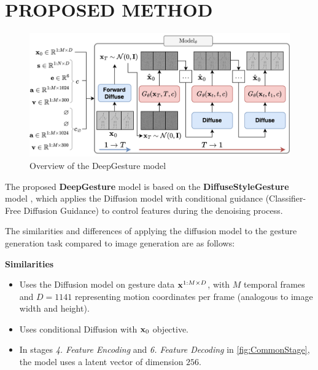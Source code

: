 \section{PROPOSED METHOD}
\label{sec:system_overview}

\begin{figure}[h]
	\centering
	\includegraphics[width=\linewidth]{figures/AllStage}
	\caption{Overview of the DeepGesture model}
	\label{fig:TrainingAndSampling}
\end{figure}

The proposed \textbf{DeepGesture} model is based on the \textbf{DiffuseStyleGesture} model \cite{yang2023diffusestylegesture}, which applies the Diffusion model \cite{ho2020denoising} with conditional guidance \cite{ho2022classifier} (Classifier-Free Diffusion Guidance) to control features during the denoising process.

The similarities and differences of applying the diffusion model to the gesture generation task compared to image generation are as follows:

\textbf{Similarities}
\begin{itemize}
	\item Uses the Diffusion model on gesture data $\mathbf{x}^{1:M \times D}$, with $M$ temporal frames and $D=1141$ representing motion coordinates per frame (analogous to image width and height).
	\item Uses conditional Diffusion with $\mathbf{x}_0$ objective.
	\item In stages \textit{4. Feature Encoding} and \textit{6. Feature Decoding} in \autoref{fig:CommonStage}, the model uses a latent vector of dimension $256$.
\end{itemize}

